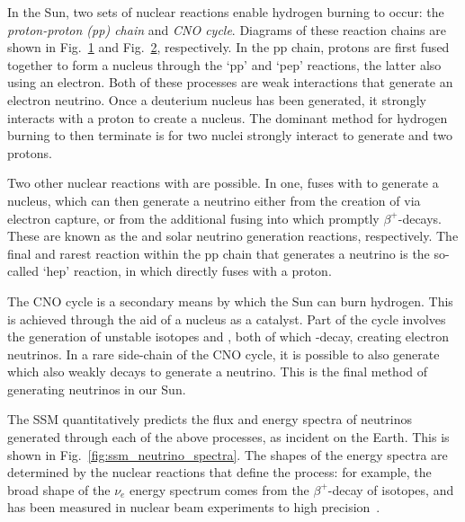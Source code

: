 In the Sun, two sets of nuclear reactions enable hydrogen burning to occur: the \textit{proton-proton (pp) chain} and \textit{CNO cycle}. Diagrams of these reaction chains are shown in Fig.~\ref{fig:pp_chain} and Fig.~\ref{fig:cno_cycle}, respectively. In the pp chain, protons are first fused together to form a  nucleus through the `pp' and `pep' reactions, the latter also using an electron. Both of these processes are weak interactions that generate an electron neutrino. Once a deuterium nucleus has been generated, it strongly interacts with a proton to create a  nucleus. The dominant method for hydrogen burning to then terminate is for two  nuclei strongly interact to generate  and two protons.

\begin{figure}
    \centering
    \caption[]{}
    \label{fig:pp_chain}
\end{figure}

\begin{figure}
    \centering
    \caption[]{}
    \label{fig:cno_cycle}
\end{figure}

Two other nuclear reactions with  are possible. In one,  fuses with  to generate a  nucleus, which can then generate a neutrino either from the creation of  via electron capture, or from the additional fusing into \beight{} which promptly $\beta^{+}$-decays. These are known as the  and \beight{} solar neutrino generation reactions, respectively. The final and rarest reaction within the pp chain that generates a neutrino is the so-called `hep' reaction, in which  directly fuses with a proton.

The CNO cycle is a secondary means by which the Sun can burn hydrogen. This is achieved through the aid of a  nucleus as a catalyst. Part of the cycle involves the generation of unstable isotopes  and , both of which \ce{\beta^{+}}-decay, creating electron neutrinos. In a rare side-chain of the CNO cycle, it is possible to also generate  which also weakly decays to generate a neutrino. This is the final method of generating neutrinos in our Sun.

The SSM quantitatively predicts the flux and energy spectra of neutrinos generated through each of the above processes, as incident on the Earth. This is shown in Fig.~\ref{fig:ssm_neutrino_spectra}. The shapes of the energy spectra are determined by the nuclear reactions that define the process: for example, the broad shape of the \beight{} $\nu_{e}$ energy spectrum comes from the $\beta^{+}$-decay of \beight{} isotopes, and has been measured in nuclear beam experiments to high precision~\cite{winterB8NeutrinoSpectrum2006}. %

